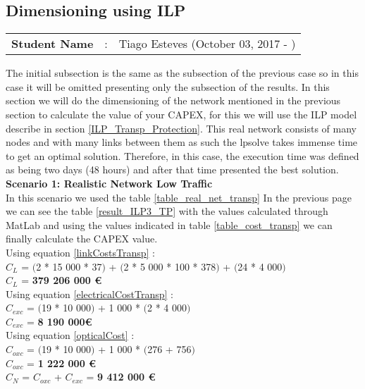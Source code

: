 \subsection{Dimensioning using ILP}
\begin{tcolorbox}	
\begin{tabular}{p{2.75cm} p{0.2cm} p{10.5cm}} 	
\textbf{Student Name}  &:& Tiago Esteves    (October 03, 2017 - )\\
\end{tabular}
\end{tcolorbox}

The initial subsection is the same as the subsection of the previous case so in this case it will be omitted presenting only the subsection of the results.
In this section we will do the dimensioning of the network mentioned in the previous section to calculate the value of your CAPEX, for this we will use the ILP model describe in section \ref{ILP_Transp_Protection}.
This real network consists of many nodes and with many links between them as such the lpsolve takes immense time to get an optimal solution. Therefore, in this case, the execution time was defined as being two days (48 hours) and after that time presented the best solution.\\

\textbf{Scenario 1: Realistic Network Low Traffic} \label{Scenario3_transp} \\

In this scenario we used the table \ref{table_real_net_transp} In the previous page we can see the table \ref{result_ILP3_TP} with the values calculated through MatLab and using the values indicated in table \ref{table_cost_transp} we can finally calculate the CAPEX value. \\

Using equation \ref{linkCostsTransp} : \\
$C_L$ = $($2 * 15 000 * 37$)$ + $($2 * 5 000 * 100 * 378$)$ + $($24 * 4 000$)$ \\
$C_L$ = \textbf{379 206 000 \euro} \\

Using equation \ref{electricalCostTransp} : \\
$C_{exc}$ = $($19 * 10 000$)$ + 1 000 * $($2 * 4 000$)$ \\
$C_{exc}$ = \textbf{8 190 000\euro} \\

Using equation \ref{opticalCost} : \\
$C_{oxc}$ = $($19 * 10 000$)$ + 1 000 * $($276 + 756$)$ \\
$C_{oxc}$ = \textbf{1 222 000 \euro} \\
$C_N$ = $C_{oxc}$ + $C_{exc}$ = \textbf{9 412 000 \euro} \\

